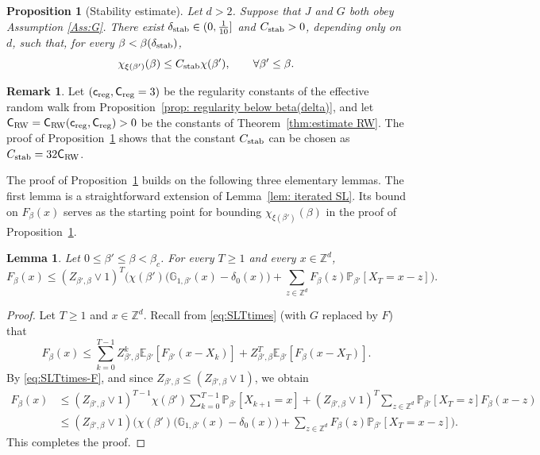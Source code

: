 \documentclass[11pt,a4paper]{article}
\numberwithin{equation}{section}
\theoremstyle{plain}
\newtheorem{Lem}[Thm]{Lemma}
\newtheorem{Prop}[Thm]{Proposition}
\theoremstyle{definition}
\newtheorem{Rem}[Thm]{Remark}
\newcommand\1{\mathds{1}}
\newcommand\Crw{\mathsf{C}_{\textup{RW}}}
\newcommand\creg{\mathsf{c}_{\textup{reg}}}
\newcommand\Creg{\mathsf{C}_{\textup{reg}}}
\newcommand{\Cstab}{C_{\textup{stab}}}
\begin{document}
\begin{Prop}[Stability estimate]
\label{Prop:stab}
Let $d>2$. Suppose that $J$ and $G$ both obey Assumption \textup{\ref{Ass:G}}.
There exist $\delta_{\textup{stab}}\in (0,\tfrac{1}{10}]$ and $\Cstab>0$, depending only on $d$, such that, for every $\beta<\beta(\delta_{\textup{stab}})$,
\begin{equation}\label{eq:propstab}
	\chi_{\xi(\beta')}(\beta)\leq \Cstab\chi(\beta'), \qquad \forall \beta'\leq \beta.
\end{equation}
\end{Prop}

\begin{Rem}
Let $(\creg,\Creg=3)$ be the regularity constants of the effective random walk from Proposition~\ref{prop: regularity below beta(delta)}, and let $\Crw=\Crw(\creg,\Creg)>0$ be the constants
of Theorem~\ref{thm:estimate RW}.  The proof of
Proposition~\ref{Prop:stab} shows that the constant $\Cstab$ can
be chosen as $\Cstab=32\Crw$.
\end{Rem}




The proof of Proposition~\ref{Prop:stab} builds on the following
three
elementary lemmas. The first lemma is a straightforward extension of Lemma~\ref{lem: iterated SL}. Its bound on $F_\beta(x)$ serves as the starting point for
bounding $\chi_{\xi(\beta')}(\beta)$ in the proof of Proposition~\ref{Prop:stab}.

\begin{Lem}
\label{lem: iterated SL-F}
Let $0\leq \beta'\leq \beta<\beta_c$. For every $T\geq 1$ and every $x\in \mathbb Z^d$,
\begin{equation}\label{eq:FGreenbdfinite}
	F_\beta(x)
    \leq
    (Z_{\beta',\beta}\vee 1)^T
    \Big(
    \chi(\beta')\big(\mathbb G_{1,\beta'}(x)-\delta_{0}(x)\big)
    +
    \sum_{z\in \mathbb Z^d}F_{\beta}(z)\mathbb P_{\beta'}[X_T=x-z]
    \Big).
\end{equation}
\end{Lem}


\begin{proof} Let $T\geq 1$ and $x\in \mathbb Z^d$.
Recall from \eqref{eq:SLTtimes} (with $G$ replaced by $F$) that
\begin{equation}\label{eq:SLTtimes-F}
	F_{\beta}(x)\leq \sum_{k=0}^{T-1}Z_{\beta',\beta}^k \mathbb E_{\beta'}[F_{\beta'}(x-X_k)]+Z_{\beta',\beta}^T\mathbb E_{\beta'}[F_{\beta}(x-X_T)].
\end{equation}
By \eqref{eq:SLTtimes-F}, and since $Z_{\beta',\beta}\leq (Z_{\beta',\beta}\vee 1)$, we obtain
\begin{align}
	F_{\beta}(x)&\leq (Z_{\beta',\beta}\vee 1)^{T-1}\chi(\beta')\sum_{k=0}^{T-1}\mathbb P_{\beta'}[X_{k+1}=x]+(Z_{\beta',\beta}\vee 1)^T\sum_{z\in \mathbb Z^d}\mathbb P_{\beta'}[X_T=z]F_{\beta}(x-z)\nonumber
	\\&\leq (Z_{\beta',\beta}\vee 1)\Big(\chi(\beta')
\big( \mathbb G_{1,\beta'}(x) - \delta_{0}(x) \big)
+\sum_{z\in \mathbb Z^d}F_\beta(z)\mathbb P_{\beta'}[X_T=x-z]\Big).
\end{align}
This completes the proof.
\end{proof}
\end{document}
